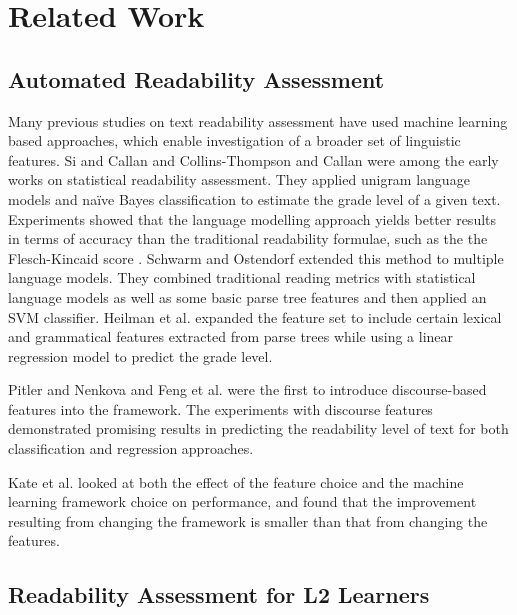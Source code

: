 \documentclass[11pt,letterpaper]{article}
\begin{document}
\section{Related Work}

        \subsection{Automated Readability Assessment}

       Many previous studies on text readability assessment have used machine learning based approaches, which enable investigation of a broader set of linguistic features. Si and Callan  and Collins-Thompson and Callan  were among the early works on statistical readability assessment. They applied unigram language models and na{\"i}ve Bayes classification to estimate the grade level of a given text. Experiments showed that the language modelling approach yields better results in terms of accuracy than the traditional readability formulae, such as the the Flesch-Kincaid score \cite{kincaid1975derivation}. Schwarm and Ostendorf  extended this method to multiple language models. They combined traditional reading metrics with statistical language models as well as some basic parse tree features and then applied an SVM classifier. Heilman et al.  expanded the feature set to include certain lexical and grammatical features extracted from parse trees while using a linear regression model to predict the grade level. 
        
        Pitler and Nenkova  and Feng et al.  were the first to introduce discourse-based features into the framework. The experiments with discourse features demonstrated promising results in predicting the readability level of text for both classification and regression approaches.
        
		Kate et al.  looked at both the effect of the feature choice and the machine learning framework choice on performance, and found that the improvement resulting from changing the framework is smaller than that from changing the features. 


		
		\subsection{Readability Assessment for L2 Learners}
		
\end{document}
